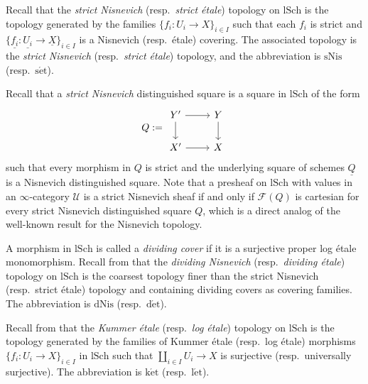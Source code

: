 \documentclass[10pt]{amsart}
\theoremstyle{definition}
\theoremstyle{remark}
\numberwithin{equation}{subsection}
\newcommand{\cF}{\mathcal{F}}
\newcommand{\cU}{\mathcal{U}}
\newcommand{\ul}{\underline}
\newcommand{\lSch}{\mathrm{lSch}}
\newcommand{\sNis}{\mathrm{sNis}}
\newcommand{\dNis}{\mathrm{dNis}}
\newcommand{\ketale}{\mathrm{k\acute{e}t}}
\newcommand{\detale}{\mathrm{d\acute{e}t}}
\newcommand{\setale}{\mathrm{s\acute{e}t}}
\newcommand{\letale}{\mathrm{l\acute{e}t}}
\begin{document}
Recall that the \emph{strict Nisnevich} (resp.\ \emph{strict \'etale}) topology on $\lSch$ is the topology generated by the families $\{f_i\colon U_i\to X\}_{i\in I}$ such that each $f_i$ is strict and $\{\ul{f_i}\colon \ul{U_i}\to \ul{X}\}_{i\in I}$ is a Nisnevich (resp.\ \'etale) covering.
The associated topology is the \emph{strict Nisnevich} (resp.\ \emph{strict \'etale}) topology, and the abbreviation is $\sNis$ (resp.\ $\setale$).

Recall that a \emph{strict Nisnevich} distinguished square is a square in $\lSch$ of the form
\[
Q
:=
\begin{tikzcd}
Y'\ar[d]\ar[r]&
Y\ar[d]
\\
X'\ar[r]&
X
\end{tikzcd}
\]
such that every morphism in $Q$ is strict and the underlying square of schemes $\ul{Q}$ is a Nisnevich distinguished square.
Note that a presheaf on $\lSch$ with values in an $\infty$-category $\cU$ is a strict Nisnevich sheaf if and only if $\cF(Q)$ is cartesian for every strict Nisnevich distinguished square $Q$,
which is a direct analog of the well-known result for the Nisnevich topology.


A morphism in $\lSch$ is called a \emph{dividing cover} if it is a surjective proper log \'etale monomorphism.
Recall from \cite[Definitions 3.1.4, 3.1.5]{logDM} that the \emph{dividing Nisnevich} (resp.\ \emph{dividing \'etale}) topology on $\lSch$ is the coarsest topology finer than the strict Nisnevich (resp.\ strict \'etale) topology and containing dividing covers as covering families.
The abbreviation is $\dNis$ (resp.\ $\detale$).

Recall from \cite[\S 2.1, 9.1]{MR1922832} that the \emph{Kummer \'etale} (resp.\ \emph{log \'etale}) topology on $\lSch$ is the topology generated by the families of Kummer \'etale (resp.\ log \'etale) morphisms $\{f_i\colon U_i\to X\}_{i\in I}$ in $\lSch$ such that $\coprod_{i\in I} U_i \to X$ is surjective (resp.\ universally surjective).
The abbreviation is $\ketale$ (resp.\ $\letale$).
\end{document}

